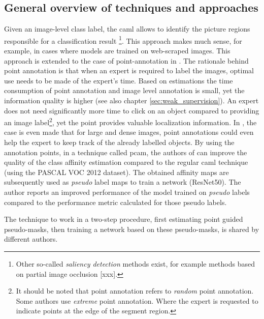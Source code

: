 \subsection{General overview of techniques and approaches}
\par{
    Given an image-level class label, the \Gls{caml}  allows to identify the picture regions responsible for a classification result \cite{Ahn2019}
    \footnote{Other so-called \textit{saliency detection} methods exist, for example methods based on partial image occlusion [xxx].}.
    This approach makes much sense, for example, in cases where models are trained on web-scraped images.
    This approach is extended to the case of point-annotation in \cite{McEver2020}. 
    The rationale behind point annotation is that when an expert is required to label the images, optimal use needs to be made of the expert's time.
    Based on estimations \cite{Bearman2015} the time consumption of point annotation and image level annotation is small, yet the information quality is higher (see also chapter \ref{sec:weak_supervision}).
    An expert does not need significantly more time to click on an object compared to providing an image label\footnote{
        It should be noted that point annotation refers to \textit{random} point annotation. Some authors \cite{Maninis2018} use \textit{extreme} point annotation. 
        Where the expert is requested to indicate points at the edge of the segment region.
    }, yet the point provides valuable localization information.
    In \cite{McEver2020}, the case is even made that for large and dense images, point annotations could even help the expert to keep track of the already labelled objects.
    By using the annotation points, in a technique called \acrfull{pcam}, the authors of \cite{McEver2020} can improve the quality of the class affinity estimation compared to the regular \Gls{caml} technique (using the PASCAL VOC 2012 dataset).
    The obtained affinity maps are subsequently used as \textit{pseudo} label maps to train a network (ResNet50). 
    The author reports an improved performance of the model trained on \textit{pseudo} labels compared to the performance metric calculated for those pseudo labels.
}
\par{
    The technique to work in a two-step procedure, first estimating point guided pseudo-masks, then training a network based on these pseudo-masks, is shared by different authors.
}

